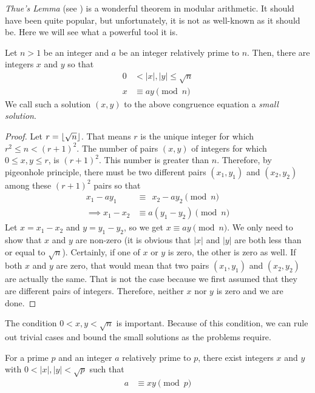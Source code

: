 \textit{Thue's Lemma} (see \textcite{thue_1902}) is a wonderful theorem in modular arithmetic. It should have been quite popular, but unfortunately, it is not as well-known as it should be. Here we will see what a powerful tool it is.

\begin{theorem}\label{thm:thue}
Let $n>1$ be an integer and $a$ be an integer relatively prime to $n$. Then, there are integers $x$ and $y$ so that
\begin{align*}
	0 &< |x|, |y| \leq \sqrt n\\
	x&\equiv ay\pmod n
\end{align*}
We call such a solution $(x,y)$ to the above congruence equation a \textit{small solution}.
\end{theorem}

\begin{proof}
Let $r=\left\lfloor{\sqrt{n}}\right\rfloor$. That means $r$ is the unique integer for which $r^2\leq n<(r+1)^2$. The number of pairs $(x,y)$ of integers for which $0\leq x,y\leq r$, is $(r+1)^2$. This number is greater than $n$. Therefore, by pigeonhole principle, there must be two different pairs $(x_1,y_1)$ and $(x_2,y_2)$ among these $(r+1)^2$ pairs so that
\begin{align*}
	x_1-ay_1
		& \equiv \ \ x_2-ay_2 \pmod n\\
	\implies x_1-x_2
		& \equiv a(y_1-y_2) \pmod n
\end{align*}
Let $x=x_1-x_2$ and $y=y_1-y_2$, so we get $x\equiv ay\pmod n$. We only need to show that $x$ and $y$ are non-zero (it is obvious that $|x|$ and $|y|$ are both less than or equal to $\sqrt n$). Certainly, if one of $x$ or $y$ is zero, the other is zero as well. If both $x$ and $y$ are zero, that would mean that two pairs $(x_1,y_1)$ and $(x_2,y_2)$ are actually the same. That is not the case because we first assumed that they are different pairs of integers. Therefore, neither $x$ nor $y$ is zero and we are done.
\end{proof}

\begin{note}
	The condition $0<x,y<\sqrt{n}$ is important. Because of this condition, we can rule out trivial cases and bound the small solutions as the problems require.
\end{note}

\begin{corollary}
	For a prime $p$ and an integer $a$ relatively prime to $p$, there exist integers $x$ and $y$ with $0<|x|,|y|<\sqrt{p}$ such that
	\begin{align*}
		a & \equiv xy\pmod p
	\end{align*}
\end{corollary}

